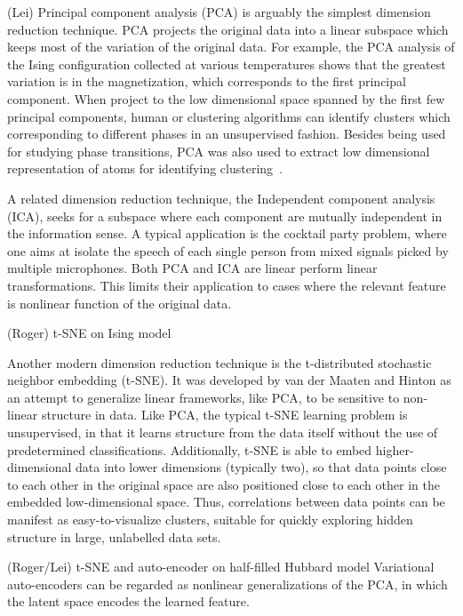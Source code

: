 \documentclass[aps,prb,floatfix,amsmath,amssymb,amsfonts,10pt,floatfix,longbibliography]{revtex4-1}
\begin{document}
\item (Lei) Principal component analysis (PCA) is arguably the simplest dimension reduction technique. PCA projects the original data into a linear subspace which keeps most of the variation of the original data. For example, the PCA analysis of the Ising configuration collected at various temperatures shows that the greatest variation is in the magnetization, which corresponds to the first principal component. When project to the low dimensional space spanned by the first few principal components, human or clustering algorithms can identify clusters which corresponding to different phases in an unsupervised fashion. Besides being used for studying phase transitions, PCA was also used to extract low dimensional representation of atoms for identifying clustering~\cite{Atom2Vec2018}. 

A related dimension reduction technique, the Independent component analysis (ICA), seeks for a subspace where each component are mutually independent in the information sense. A typical application is the cocktail party problem, where one aims at isolate the speech of each single person from  mixed signals picked by multiple microphones. 
Both PCA and ICA are linear perform linear transformations. This limits their application to cases where the relevant feature is nonlinear function of the original data. 

\item (Roger) t-SNE on Ising model \cite{Carrasquilla2017a}

Another modern dimension reduction technique is the t-distributed stochastic neighbor embedding (t-SNE).  It was developed by van der Maaten and Hinton as an attempt to generalize linear frameworks, like PCA, to be sensitive to non-linear structure in data. Like PCA, the typical t-SNE learning problem is unsupervised, in that it learns structure from the data itself without the use of predetermined classifications.  Additionally, t-SNE is able to embed higher-dimensional data into lower dimensions (typically two), 
so that data points close to each other in the original space are also positioned close to each other in the embedded low-dimensional space.  Thus, correlations between data points can be manifest as easy-to-visualize clusters, suitable for quickly exploring hidden structure in large, unlabelled data sets.


\item (Roger/Lei) t-SNE and auto-encoder on half-filled Hubbard model \cite{Chng2018}
Variational auto-encoders can be regarded as nonlinear generalizations of the PCA, in which the latent space encodes the learned feature. 
\end{document}
